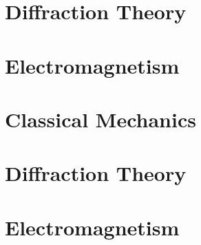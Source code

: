 \documentclass{book}                                                           %
\newcommand*{\TOPPATH}{books}
\newcommand*{\PATH}{\TOPPATH/}
\begin{document}
        \part{Diffraction Theory}
            
            
            
        \part{Electromagnetism}
           
    \else
        \part{Classical Mechanics}
        \part{Diffraction Theory}
        \part{Electromagnetism}
    \fi
    \clearpage

    \printnoidxglossary[type=\acronymtype]
    \clearpage
    \printnoidxglossary[type=notation, style=mcolindex, sort=def]
    \clearpage
    \printnoidxglossary[style=longpara]

    \clearpage
    \nocite{*}
    
    

    \clearpage
    \printindex
\end{document}
